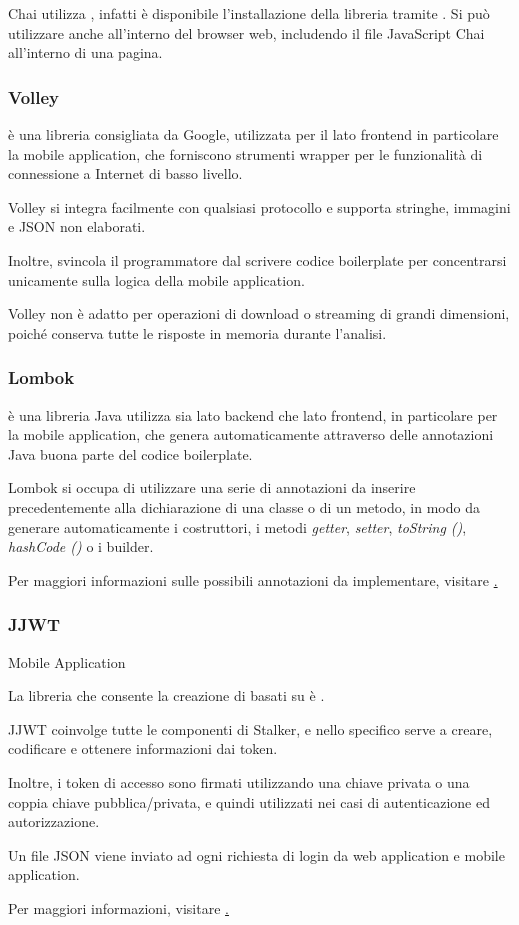 \documentclass[../../../manuale-manutentore.tex]{subfiles}
\begin{document}
Chai utilizza , infatti è disponibile l'installazione della libreria tramite . Si può utilizzare anche all'interno del browser web, includendo il file JavaScript Chai all'interno di una pagina.

\subsubsection{Volley}%
\label{subs:volley}

 è una libreria consigliata da Google, utilizzata per il lato frontend in particolare la mobile application, che forniscono strumenti wrapper per le funzionalità di connessione a Internet di basso livello.

Volley si integra facilmente con qualsiasi protocollo e supporta stringhe, immagini e JSON non elaborati.

Inoltre, svincola il programmatore dal scrivere codice boilerplate per concentrarsi unicamente sulla logica della mobile application.

Volley non è adatto per operazioni di download o streaming di grandi dimensioni, poiché conserva tutte le risposte in memoria durante l'analisi.

\subsubsection{Lombok}%
\label{subs:lombok}

 è una libreria Java utilizza sia lato backend che lato frontend, in particolare per la mobile application, che genera automaticamente attraverso delle annotazioni Java buona parte del codice boilerplate.

Lombok si occupa di utilizzare una serie di annotazioni da inserire precedentemente alla dichiarazione di una classe o di un metodo, in modo da generare automaticamente i costruttori, i metodi \textit{getter}, \textit{setter}, \textit{toString ()}, \textit{hashCode ()} o i builder.

Per maggiori informazioni sulle possibili annotazioni da implementare, visitare \href{https://projectlombok.org/features/all}.

\subsubsection{JJWT}%
\label{subs:jjwt}
Mobile Application

La libreria che consente la creazione di  basati su  è .

JJWT coinvolge tutte le componenti di Stalker, e nello specifico serve a creare, codificare e ottenere informazioni dai token.

Inoltre, i token di accesso sono firmati utilizzando una chiave privata o una coppia chiave pubblica/privata, e quindi utilizzati nei casi di autenticazione ed autorizzazione.

Un file JSON viene inviato ad ogni richiesta di login da web application e mobile application.

Per maggiori informazioni, visitare \href{https://github.com/jwtk/jjwt}.
\end{document}
